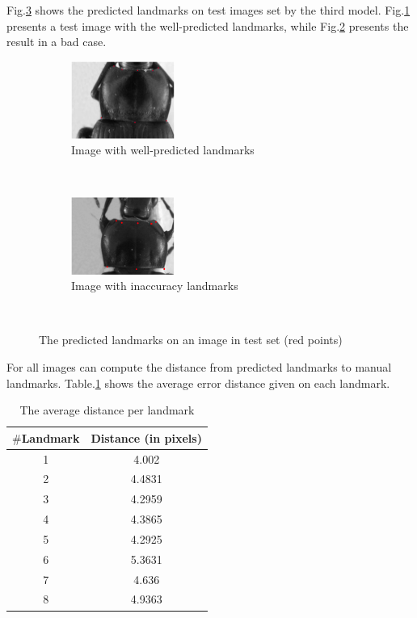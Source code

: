 \documentclass[conference]{IEEEtran}
\begin{document}
Fig.\ref{figrsexample} shows the predicted landmarks on test images set by the third model. Fig.\ref{figsub1} presents a test image with the well-predicted landmarks, while Fig.\ref{figsub2} presents the result in a bad case.
\begin{figure}[h]
    \centering
    \begin{subfigure}[t]{0.25\textwidth}
        \centering
        \includegraphics[height=1.0in]{images/plandmark.eps}
        \caption{Image with well-predicted landmarks}
        \label{figsub1}
    \end{subfigure}%
    ~ 
    \begin{subfigure}[t]{0.25\textwidth}
        \centering
        \includegraphics[height=1.0in]{images/plandmark2.eps}
        \caption{Image with inaccuracy landmarks}
        \label{figsub2}
    \end{subfigure}
    \caption{The predicted landmarks on an image in test set (red points)}\
    \label{figrsexample}
\end{figure}

For all images can compute the distance from predicted landmarks to manual landmarks. Table.\ref{tab2} shows the average error distance given on each landmark.

\begin{table}[htbp]
\centering
\caption{The average distance per landmark}
\begin{center}
\begin{tabular}{|c|c|}
\hline
\textbf{$\#$Landmark} & \textbf{Distance} (in pixels) \\ \hline
1 & 4.002  \\ \hline
2 & 4.4831 \\ \hline
3 & 4.2959 \\ \hline
4 & 4.3865 \\ \hline
5 & 4.2925 \\ \hline
6 & 5.3631 \\ \hline
7 & 4.636 \\ \hline
8 & 4.9363 \\ \hline
\end{tabular}
\label{tab2}
\end{center}
\end{table}
\end{document}
